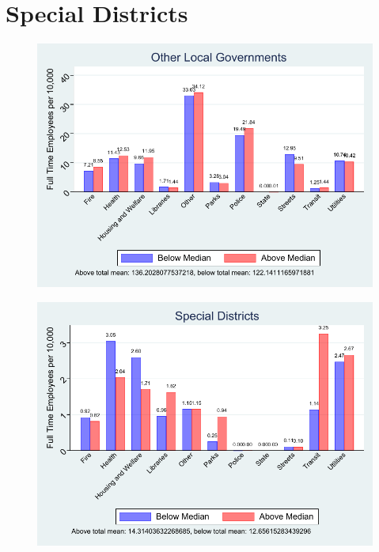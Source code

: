 \documentclass{article}
\begin{document}
\section{Special Districts}
\begin{figure}
	\includegraphics{figures/implications/spdist_emp_ft_0.pdf}
\end{figure}
\begin{figure}
	\includegraphics{figures/implications/spdist_emp_ft_1.pdf}
\end{figure}
\clearpage
\end{document}
